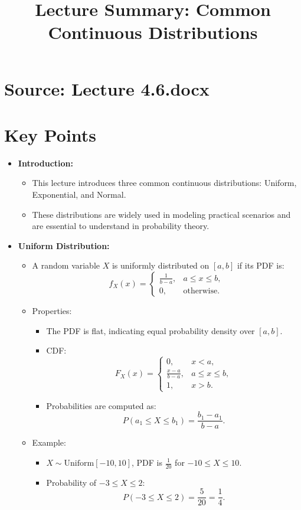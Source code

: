 \documentclass{article}
\title{Lecture Summary: Common Continuous Distributions}
\author{}
\date{}
\begin{document}
\maketitle

\section*{Source: Lecture 4.6.docx}

\section*{Key Points}

\begin{itemize}
  \item \textbf{Introduction:}
    \begin{itemize}
      \item This lecture introduces three common continuous distributions: Uniform, Exponential, and Normal.
      \item These distributions are widely used in modeling practical scenarios and are essential to understand in probability theory.
    \end{itemize}

  \item \textbf{Uniform Distribution:}
    \begin{itemize}
      \item A random variable $X$ is uniformly distributed on $[a, b]$ if its PDF is:
        \[
          f_X(x) =
          \begin{cases}
            \frac{1}{b-a}, & a \leq x \leq b, \\
            0, & \text{otherwise}.
          \end{cases}
        \]
      \item Properties:
        \begin{itemize}
          \item The PDF is flat, indicating equal probability density over $[a, b]$.
          \item CDF:
            \[
              F_X(x) =
              \begin{cases}
                0, & x < a, \\
                \frac{x-a}{b-a}, & a \leq x \leq b, \\
                1, & x > b.
              \end{cases}
            \]
          \item Probabilities are computed as:
            \[
              P(a_1 \leq X \leq b_1) = \frac{b_1 - a_1}{b-a}.
            \]
        \end{itemize}
      \item Example:
        \begin{itemize}
          \item $X \sim \text{Uniform}[-10, 10]$, PDF is $\frac{1}{20}$ for $-10 \leq X \leq 10$.
          \item Probability of $-3 \leq X \leq 2$:
            \[
              P(-3 \leq X \leq 2) = \frac{5}{20} = \frac{1}{4}.
            \]
        \end{itemize}
    \end{itemize}


\end{itemize}
\end{document}
